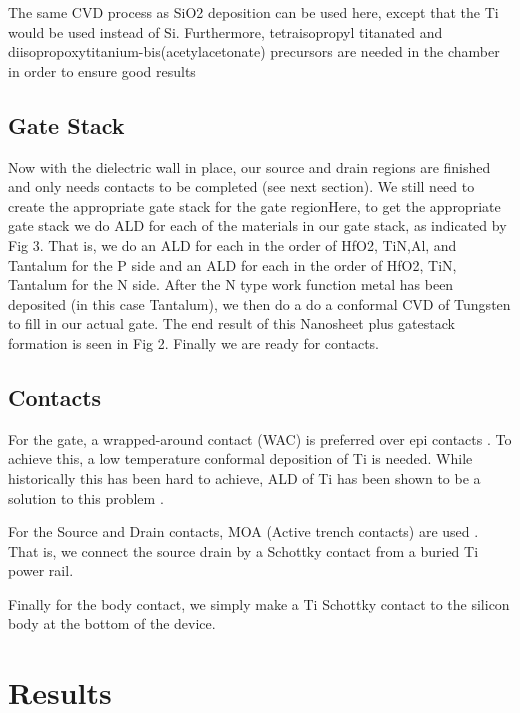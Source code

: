 \documentclass[letterpaper, 12 pt, conference]{ieeeconf}  %
\begin{document}
The same CVD process as SiO2 deposition can be used here, except that the Ti would be used instead of Si. Furthermore, tetraisopropyl titanated  and
diisopropoxytitanium-bis(acetylacetonate) precursors are needed in the chamber in order to ensure good results \cite{c9}



\subsection{Gate Stack}

Now with the dielectric wall in place, our source and drain regions are finished and only needs contacts to be completed (see next section). We still need to create the appropriate gate stack for the gate regionHere, to get the appropriate gate stack we do ALD for each of the materials in our gate stack, as indicated by Fig 3. That is, we do an ALD for each in the order of HfO2, TiN,Al, and Tantalum for the P side and   an ALD for each in the order of HfO2, TiN, Tantalum for the N side.  After the N type work function metal has been deposited (in this case Tantalum), we then do a do a conformal CVD of Tungsten to fill in our actual gate. The end result of this Nanosheet plus gatestack formation is seen in Fig 2. Finally we are ready for contacts.


\subsection{Contacts}

For the gate, a wrapped-around contact (WAC) is preferred over epi contacts \cite{c1}. To achieve this, a low temperature conformal deposition of Ti is needed. While historically this has been hard to achieve, ALD of Ti has been shown to be a solution to this problem \cite{c18}.  

For the Source and Drain contacts, MOA (Active trench contacts) are used \cite{c1}. That is, we connect the source drain by a Schottky contact from a buried Ti power rail.

Finally for the body contact, we simply make a Ti Schottky contact to the silicon body at the bottom of the device. 

 
\section{Results}

\end{document}
